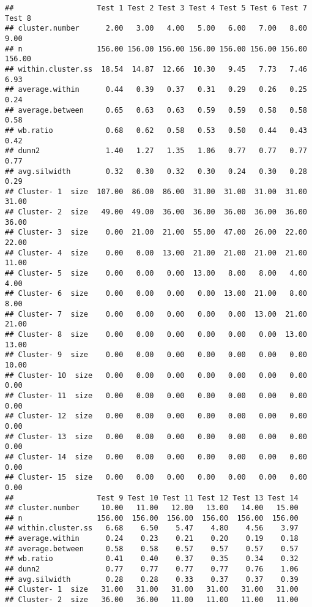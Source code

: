 \documentclass[
]{article}
\begin{document}
\begin{verbatim}
##                   Test 1 Test 2 Test 3 Test 4 Test 5 Test 6 Test 7 Test 8
## cluster.number      2.00   3.00   4.00   5.00   6.00   7.00   8.00   9.00
## n                 156.00 156.00 156.00 156.00 156.00 156.00 156.00 156.00
## within.cluster.ss  18.54  14.87  12.66  10.30   9.45   7.73   7.46   6.93
## average.within      0.44   0.39   0.37   0.31   0.29   0.26   0.25   0.24
## average.between     0.65   0.63   0.63   0.59   0.59   0.58   0.58   0.58
## wb.ratio            0.68   0.62   0.58   0.53   0.50   0.44   0.43   0.42
## dunn2               1.40   1.27   1.35   1.06   0.77   0.77   0.77   0.77
## avg.silwidth        0.32   0.30   0.32   0.30   0.24   0.30   0.28   0.29
## Cluster- 1  size  107.00  86.00  86.00  31.00  31.00  31.00  31.00  31.00
## Cluster- 2  size   49.00  49.00  36.00  36.00  36.00  36.00  36.00  36.00
## Cluster- 3  size    0.00  21.00  21.00  55.00  47.00  26.00  22.00  22.00
## Cluster- 4  size    0.00   0.00  13.00  21.00  21.00  21.00  21.00  11.00
## Cluster- 5  size    0.00   0.00   0.00  13.00   8.00   8.00   4.00   4.00
## Cluster- 6  size    0.00   0.00   0.00   0.00  13.00  21.00   8.00   8.00
## Cluster- 7  size    0.00   0.00   0.00   0.00   0.00  13.00  21.00  21.00
## Cluster- 8  size    0.00   0.00   0.00   0.00   0.00   0.00  13.00  13.00
## Cluster- 9  size    0.00   0.00   0.00   0.00   0.00   0.00   0.00  10.00
## Cluster- 10  size   0.00   0.00   0.00   0.00   0.00   0.00   0.00   0.00
## Cluster- 11  size   0.00   0.00   0.00   0.00   0.00   0.00   0.00   0.00
## Cluster- 12  size   0.00   0.00   0.00   0.00   0.00   0.00   0.00   0.00
## Cluster- 13  size   0.00   0.00   0.00   0.00   0.00   0.00   0.00   0.00
## Cluster- 14  size   0.00   0.00   0.00   0.00   0.00   0.00   0.00   0.00
## Cluster- 15  size   0.00   0.00   0.00   0.00   0.00   0.00   0.00   0.00
##                   Test 9 Test 10 Test 11 Test 12 Test 13 Test 14
## cluster.number     10.00   11.00   12.00   13.00   14.00   15.00
## n                 156.00  156.00  156.00  156.00  156.00  156.00
## within.cluster.ss   6.68    6.50    5.47    4.80    4.56    3.97
## average.within      0.24    0.23    0.21    0.20    0.19    0.18
## average.between     0.58    0.58    0.57    0.57    0.57    0.57
## wb.ratio            0.41    0.40    0.37    0.35    0.34    0.32
## dunn2               0.77    0.77    0.77    0.77    0.76    1.06
## avg.silwidth        0.28    0.28    0.33    0.37    0.37    0.39
## Cluster- 1  size   31.00   31.00   31.00   31.00   31.00   31.00
## Cluster- 2  size   36.00   36.00   11.00   11.00   11.00   11.00

\end{verbatim}
\end{document}
